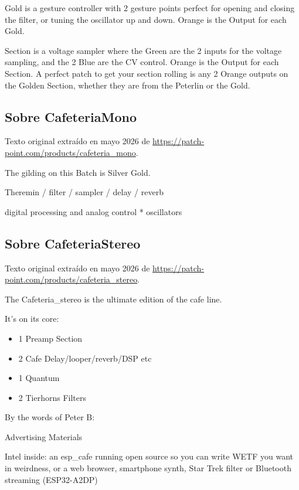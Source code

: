 Gold is a gesture controller with 2 gesture points perfect for opening and closing the filter, or tuning the oscillator up and down.  Orange is the Output for each Gold.

Section is a voltage sampler where the Green are the 2 inputs for the voltage sampling, and the 2 Blue are the CV control. Orange is the Output for each Section.  A perfect patch to get your section rolling is any 2 Orange outputs on the Golden Section, whether they are from the Peterlin or the Gold.

\newpage

\subsection{Sobre Cafeteria\textunderscore Mono}


Texto original extraído en mayo 2026 de \url{https://patch-point.com/products/cafeteria_mono}.

The gilding on this Batch is Silver Gold.

Theremin / filter / sampler / delay / reverb

digital processing and analog control * oscillators

\newpage

\subsection{Sobre Cafeteria\textunderscore Stereo}

Texto original extraído en mayo 2026 de \url{https://patch-point.com/products/cafeteria_stereo}.

The Cafeteria\_stereo is the ultimate edition of the cafe line.

It's on its core: 


\begin{itemize}
	\item 1 Preamp Section
	\item 2 Cafe Delay/looper/reverb/DSP etc
	\item 1 Quantum
	\item 2 Tierhorns Filters
\end{itemize}

By the words of Peter B:

Advertising Materials

Intel inside: an esp\_cafe running open source so you can write WETF you want in weirdness, or a web browser, smartphone synth, Star Trek filter or Bluetooth streaming (ESP32-A2DP)

